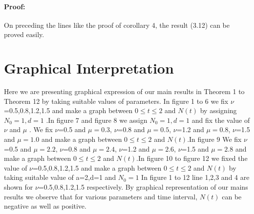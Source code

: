 \documentclass[leqno]{article}
\begin{document}
\paragraph{Proof:}
On preceding the lines like the proof of corollary 4, the result (3.12) can be proved easily.

\section{Graphical Interpretation}
Here we are presenting graphical expression of our main results in Theorem 1 to Theorem 12 by taking suitable values of parameters. In figure 1 to 6  we fix $\nu$=0.5,0.8,1.2,1.5 and make  a graph between $0 \leq t \leq 2$ and $N(t)$ by assigning $N_0 = 1, d= 1$ .In figure 7 and figure  8  we assign $N_0 = 1, d= 1$ and fix the value of $\nu$ and $\mu$ . We fix $\nu$=0.5 and $\mu =0.3$, $\nu$=0.8 and $\mu =0.5$, $\nu$=1.2 and $\mu =0.8$, $\nu$=1.5 and $\mu =1.0$ and make a graph between $0 \leq t \leq 2$ and $N(t)$.In figure 9  We fix $\nu$=0.5 and $\mu =2.2$, $\nu$=0.8 and $\mu =2.4$, $\nu$=1.2 and $\mu =2.6$, $\nu$=1.5 and $\mu =2.8$ and make a graph between $0 \leq t \leq 2$ and $N(t)$.In figure 10  to figure  12  we fixed the value of $\nu$=0.5,0.8,1.2,1.5 and  make a graph between $0 \leq t \leq 2$ and $N(t)$ by taking suitable value of a=2,d=1 and $N_0 = 1$ In figure 1 to 12 line 1,2,3 and 4 are shown for  $\nu$=0.5,0.8,1.2,1.5 respectively. By graphical representation of our mains results we observe that for various parameters and time interval, $N (t)$ can be negative as well as positive.\\
\end{document}
